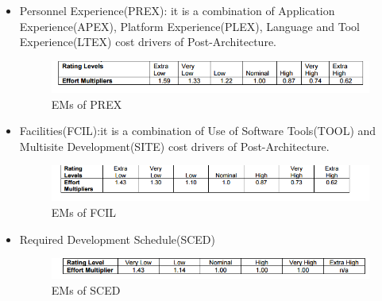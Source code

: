 \begin{itemize}
\begin{itemize}[label = {-}]
\item Personnel Experience(PREX): it is a combination of Application Experience(APEX), Platform Experience(PLEX), Language and Tool Experience(LTEX) cost drivers of Post-Architecture. 
\begin{figure}[H]	
	\centering
	\includegraphics[scale = 0.6]{img/PREX.png}
	\caption{EMs of PREX}
\end{figure}

\item Facilities(FCIL):it is a combination of Use of Software Tools(TOOL) and Multisite Development(SITE) cost drivers of Post-Architecture. 

\begin{figure}[H]	
	\centering
	\includegraphics[scale = 0.6]{img/FCIL.png}
	\caption{EMs of FCIL}
\end{figure}

\item Required Development Schedule(SCED)

\begin{figure}[H]	
	\centering
	\includegraphics[scale = 0.6]{img/SCED.png}
	\caption{EMs of SCED}
\end{figure}

\end{itemize} 
\end{itemize}


